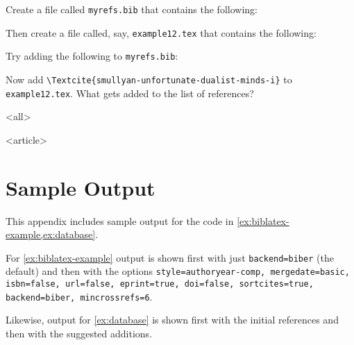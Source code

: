 \begin{exercise}\label{ex:database}
  Create a file called \texttt{myrefs.bib} that contains the following: 

  Then create a file called, say, \texttt{example12.tex} that contains the following: 

  Try adding the following to \texttt{myrefs.bib}:
  

  Now add \verb|\Textcite{smullyan-unfortunate-dualist-minds-i}| to \texttt{example12.tex}.
  What gets added to the list of references?

\end{exercise}

\mode
<all>


\mode
<article>


\appendix\label{app}
\section<1-| beamer:0>{Sample Output}\label{sec:samples}

This appendix includes sample output for the code in \cref{ex:biblatex-example,ex:database}.

For \cref{ex:biblatex-example} output is shown first with just \texttt{backend=biber} (the default) and then with the options \texttt{style=authoryear-comp, mergedate=basic, isbn=false, url=false, eprint=true, doi=false, sortcites=true, backend=biber, mincrossrefs=6}.

Likewise, output for \cref{ex:database} is shown first with the initial references and then with the suggested additions.



{\centering
  \par
  \par
}

